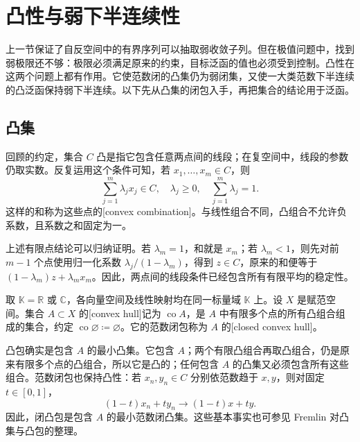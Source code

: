\section{凸性与弱下半连续性}
\label{b1:sec:0905}

上一节保证了自反空间中的有界序列可以抽取弱收敛子列。但在极值问题中，找到弱极限还不够：极限必须满足原来的约束，目标泛函的值也必须受到控制。凸性在这两个问题上都有作用。它使范数闭的凸集仍为弱闭集，又使一大类范数下半连续的凸泛函保持弱下半连续。以下先从凸集的闭包入手，再把集合的结论用于泛函。

\subsection{凸集}
\label{b1:subsec:090501}

回顾的约定，集合 \(C\) 凸是指它包含任意两点间的线段；在复空间中，线段的参数仍取实数。反复运用这个条件可知，若 \(x_1,\ldots,x_m\in C\)，则
\[
  \sum_{j=1}^{m}\lambda_jx_j\in C,
  \quad \lambda_j\geq0,\quad \sum_{j=1}^{m}\lambda_j=1.
\]
这样的和称为这些点的[convex combination]。与线性组合不同，凸组合不允许负系数，且系数之和固定为一。

\ProseParagraphBreak

上述有限点结论可以归纳证明。若 \(\lambda_m=1\)，和就是 \(x_m\)；若 \(\lambda_m<1\)，则先对前 \(m-1\) 个点使用归一化系数 \(\lambda_j/(1-\lambda_m)\)，得到 \(z\in C\)，原来的和便等于 \((1-\lambda_m)z+\lambda_mx_m\)。因此，两点间的线段条件已经包含所有有限平均的稳定性。

\begin{definition}[凸包与闭凸包]
\label{b1:def:convex-hull}
取 \(\mathbb K=\mathbb R\) 或 \(\mathbb C\)，各向量空间及线性映射均在同一标量域 \(\mathbb K\) 上。设 \(X\) 是赋范空间。集合 \(A\subset X\) 的[convex hull]记为 \(\operatorname{co}A\)，是 \(A\) 中有限多个点的所有凸组合组成的集合，约定 \(\operatorname{co}\varnothing\coloneqq\varnothing\)。它的范数闭包称为 \(A\) 的[closed convex hull]。
\end{definition}

凸包确实是包含 \(A\) 的最小凸集。它包含 \(A\)；两个有限凸组合再取凸组合，仍是原来有限多个点的凸组合，所以它是凸的；任何包含 \(A\) 的凸集又必须包含所有这些组合。范数闭包也保持凸性：若 \(x_n,y_n\in C\) 分别依范数趋于 \(x,y\)，则对固定 \(t\in[0,1]\)，
\[
  (1-t)x_n+ty_n\longrightarrow(1-t)x+ty.
\]
因此，闭凸包是包含 \(A\) 的最小范数闭凸集。这些基本事实也可参见 Fremlin 对凸集与凸包的整理\cite[Volume 2, 2A5E]{Fremlin2016Measure}。

